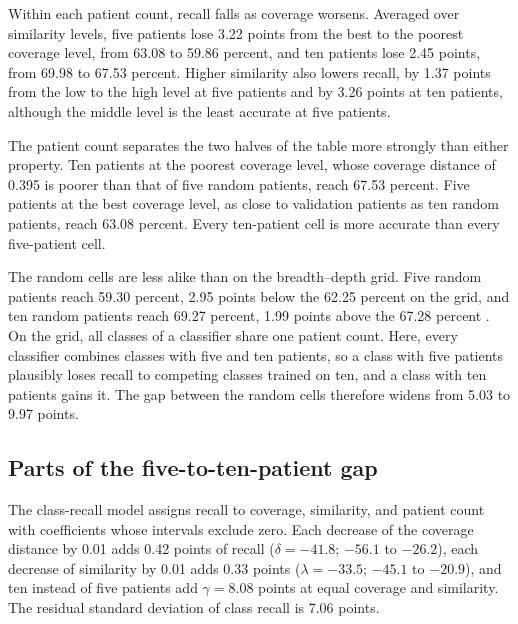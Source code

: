 \noindent Within each patient count, recall falls as coverage worsens. Averaged over similarity levels, five patients lose 3.22 points from the best to the poorest coverage level, from 63.08 to 59.86 percent, and ten patients lose 2.45 points, from 69.98 to 67.53 percent. Higher similarity also lowers recall, by 1.37 points from the low to the high level at five patients and by 3.26 points at ten patients, although the middle level is the least accurate at five patients.

The patient count separates the two halves of the table more strongly than either property. Ten patients at the poorest coverage level, whose coverage distance of 0.395 is poorer than that of five random patients, reach 67.53 percent. Five patients at the best coverage level, as close to validation patients as ten random patients, reach 63.08 percent. Every ten-patient cell is more accurate than every five-patient cell.

The random cells are less alike than on the breadth--depth grid. Five random patients reach 59.30 percent, 2.95 points below the 62.25 percent on the grid, and ten random patients reach 69.27 percent, 1.99 points above the 67.28 percent \citep{queisler2026effectiveSupport}. On the grid, all classes of a classifier share one patient count. Here, every classifier combines classes with five and ten patients, so a class with five patients plausibly loses recall to competing classes trained on ten, and a class with ten patients gains it. The gap between the random cells therefore widens from 5.03 to 9.97 points.

\subsection{Parts of the five-to-ten-patient gap}
\label{sec:parts-results}
The class-recall model assigns recall to coverage, similarity, and patient count with coefficients whose intervals exclude zero. Each decrease of the coverage distance by 0.01 adds 0.42 points of recall ($\delta=-41.8$; $-56.1$ to $-26.2$), each decrease of similarity by 0.01 adds 0.33 points ($\lambda=-33.5$; $-45.1$ to $-20.9$), and ten instead of five patients add $\gamma=8.08$ points at equal coverage and similarity. The residual standard deviation of class recall is 7.06 points.


